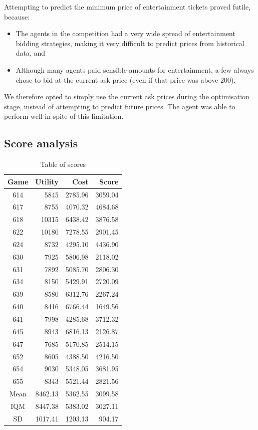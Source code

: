 \documentclass[a4paper]{proc}
\begin{document}
Attempting to predict the minimum price of entertainment tickets proved futile, because:

\begin{itemize}
  \item The agents in the competition had a very wide spread of entertainment bidding strategies, making it very difficult to predict prices from historical data, and
  \item Although many agents paid sensible amounts for entertainment, a few always chose to bid at the current ask price (even if that price was above 200).
\end{itemize}

We therefore opted to simply use the current ask prices during the optimisation stage, instead of attempting to predict future prices. The agent was able to perform well in spite of this limitation.

\subsection{Score analysis}

\begin{table}
  \caption{Table of scores}
  \label{tab:scores}
  \center
  \begin{tabular}{ c | r r r }
    Game & Utility & Cost    & Score   \\
    \hline
    614  & 5845    & 2785.96 & 3059.04 \\
    617  & 8755    & 4070.32 & 4684.68 \\
    618  & 10315   & 6438.42 & 3876.58 \\
    622  & 10180   & 7278.55 & 2901.45 \\
    624  & 8732    & 4295.10 & 4436.90 \\
    630  & 7925    & 5806.98 & 2118.02 \\
    631  & 7892    & 5085.70 & 2806.30 \\
    634  & 8150    & 5429.91 & 2720.09 \\
    639  & 8580    & 6312.76 & 2267.24 \\
    640  & 8416    & 6766.44 & 1649.56 \\
    641  & 7998    & 4285.68 & 3712.32 \\
    645  & 8943    & 6816.13 & 2126.87 \\
    647  & 7685    & 5170.85 & 2514.15 \\
    652  & 8605    & 4388.50 & 4216.50 \\
    654  & 9030    & 5348.05 & 3681.95 \\
    655  & 8343    & 5521.44 & 2821.56 \\
    \hline
    Mean & 8462.13 & 5362.55 & 3099.58 \\
    IQM  & 8447.38 & 5383.02 & 3027.11 \\
    SD   & 1017.41 & 1203.13 &  904.17 \\
  \end{tabular}
\end{table}
\end{document}
